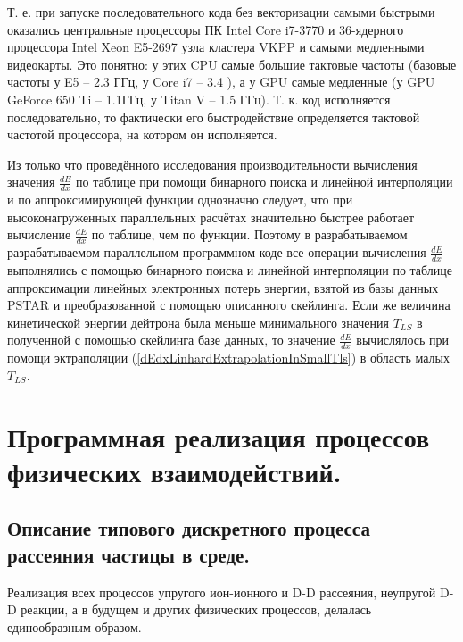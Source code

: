 \documentclass[a4paper,12pt]{article}
\begin{document}
\begin{large}
	Т. е. при запуске последовательного кода без векторизации самыми быстрыми оказались центральные процессоры ПК Intel Core i7-3770 и 36-ядерного процессора Intel Xeon E5-2697 узла кластера VKPP и самыми медленными видеокарты.
	Это понятно: у этих CPU самые большие тактовые частоты (базовые частоты у E5 – 2.3 ГГц, у Core i7 – 3.4 ), а у GPU самые медленные (у GPU GeForce 650 Ti -- 1.1ГГц, у Titan V -- 1.5 ГГц).
	Т. к. код исполняется последовательно, то фактически его быстродействие определяется тактовой частотой процессора, на котором он исполняется.
	
	Из только что проведённого исследования производительности вычисления значения $
\frac{dE}{dx}$ по таблице при помощи бинарного поиска и линейной интерполяции и по аппроксимирующей функции однозначно следует, что при высоконагруженных параллельных расчётах значительно быстрее работает вычисление $\frac{dE}{dx}$ по таблице, чем по функции.
	Поэтому в разрабатываемом разрабатываемом параллельном программном коде все операции вычисления $\frac{dE}{dx}$ выполнялись с помощью бинарного поиска и линейной интерполяции по таблице аппроксимации линейных электронных потерь энергии, взятой из базы данных PSTAR и преобразованной с помощью описанного скейлинга.
	Если же величина кинетической энергии дейтрона была меньше минимального значения $T_{LS}$ в полученной с помощью скейлинга базе данных, то значение $\frac{dE}{dx}$ вычислялось при помощи эктраполяции (\ref{dEdxLinhardExtrapolationInSmallTls}) в область малых $T_{LS}$.

  
  

\clearpage{}
\section{Программная реализация процессов физических взаимодействий.}
\subsection{Описание типового дискретного процесса рассеяния частицы в среде.}
\label{TypicalPhysicalProcessDescription}

	Реализация всех процессов упругого ион-ионного и D-D рассеяния, неупругой D-D реакции, а в будущем и других физических процессов, делалась единообразным образом.
	

\end{large}
\end{document}
